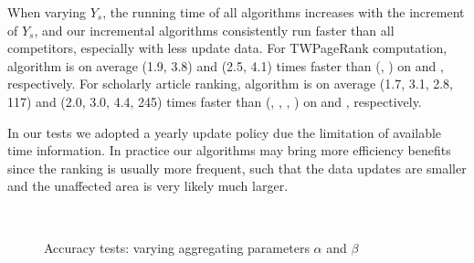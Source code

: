 When varying $Y_s$, the running time of all algorithms increases with the increment of $Y_s$, and our incremental algorithms
consistently run faster than all competitors, especially with less update data.
%
For TWPageRank computation, algorithm \inctwprscc is on average (1.9, 3.8) and (2.5, 4.1) times faster than (\twprscc, \powtwprscc) on \aminer and \magdata, respectively.
%
For scholarly article ranking, algorithm \incensemble is on average (1.7, 3.1, 2.8, 117) and (2.0, 3.0, 4.4, 245) times faster than (\batensemble, \powensemble, \futurerank, \hhgrank) on \aminer and \magdata, respectively.

In our tests we adopted a yearly update policy due the limitation of  available time information. In practice our algorithms may bring more efficiency benefits since the ranking is usually more frequent, such that the data updates are smaller and the unaffected area is very likely much larger.



\newcommand{\graphscaleexpapp}{0.25}
\newcommand{\graphmarginexpapp}{-2ex}
\begin{figure}[tb!]
\addtolength{\subfigcapskip}{-1ex}
\begin{center}
\hfill
{}
\hfill
{}
\\ %
\vspace{-2ex}
\hfill
{}
\hfill
{}
\end{center}
\vspace{-2.5ex}
\caption{\small Accuracy tests: varying aggregating parameters $\alpha$ and $\beta$}
\label{exp-ab}
\vspace{-3ex}
\end{figure}


